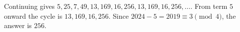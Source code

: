 Continuing gives $5,25,7,49,13,169,16,256,13,169,16,256,\ldots$. From term $5$ onward the cycle is $13,169,16,256$. Since $2024-5=2019\equiv3\pmod4$, the answer is $\boxed{256}$.
